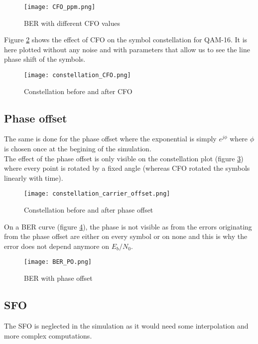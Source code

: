 \begin{figure}[H]
    \centering
    \texttt{[image: CFO\_ppm.png]}
    \caption{BER with different CFO values}
    \label{fig:CFO_BER}
\end{figure}

Figure \ref{fig:CFO_const} shows the effect of CFO on the symbol constellation for QAM-16. It is here plotted without any noise and with parameters that allow us to see the line phase shift of the symbols. \\

\begin{figure}[H]
    \centering
    \texttt{[image: constellation\_CFO.png]}
    \caption{Constellation before and after CFO}
    \label{fig:CFO_const}
\end{figure}

\subsection{Phase offset}
The same is done for the phase offset where the exponential is simply $e^{j\phi}$ where $\phi$ is chosen once at the begining of the simulation. \\

The effect of the phase offset is only visible on the constellation plot (figure \ref{fig:phaseOffsetConst}) where every point is rotated by a fixed angle (whereas CFO rotated the symbols linearly with time). \\

\begin{figure}[H]
    \centering
    \texttt{[image: constellation\_carrier\_offset.png]}
    \caption{Constellation before and after phase offset}
    \label{fig:phaseOffsetConst}
\end{figure}

On a BER curve (figure \ref{fig:BER_PO}), the phase is not visible as from the errors originating from the phase offset are either on every symbol or on none and this is why the error does not depend anymore on $E_b/N_0$. \\

\begin{figure}[H]
    \centering
    \texttt{[image: BER\_PO.png]}
    \caption{BER with phase offset}
    \label{fig:BER_PO}
\end{figure}

\subsection{SFO}
The SFO is neglected in the simulation as it would need some interpolation and more complex computations. \\

